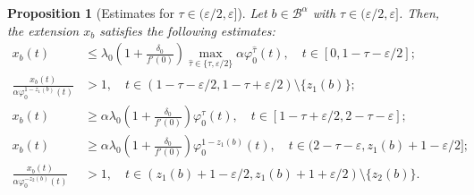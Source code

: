 \documentclass[a4paper,11pt]{article}
\theoremstyle{plain}
\newtheorem{prop}[thm]{Proposition}
\theoremstyle{definition}
\theoremstyle{definition}
\newcommand{\B}{\mathcal{B}}
\numberwithin{equation}{section}
\begin{document}
\begin{prop}[Estimates for $\tau\in(\varepsilon/2,\varepsilon{]}$] \label{prop:estimates2}
Let $b\in\B^\alpha$ with $\tau\in(\varepsilon/2,\varepsilon]$. Then, the extension $x_b$ satisfies the following estimates:
\begin{align}
    x_b(t) &\leq \lambda_0 \left( 1+\frac{\delta_0}{f'(0)} \right) \max_{\hat{\tau}\in\{\tau,\varepsilon/2\}} \alpha \varphi_0^{\hat{\tau}} (t), \quad t\in[0,1-\tau-\varepsilon/2]; \label{estimate4} \\ 
    \frac{x_b(t)}{\alpha \varphi_0^{1-z_1(b)}(t)} &>1, \quad t\in(1-\tau-\varepsilon/2,1-\tau+\varepsilon/2) \setminus \{ z_1(b) \};\label{stepness3} \\ 
    x_b(t) &\geq \alpha\lambda_0 \left( 1+\frac{\delta_0}{f'(0)} \right) \varphi_0^\tau (t), \quad t\in[1-\tau+\varepsilon/2, 2-\tau-\varepsilon];\label{estimate5} \\
    x_b(t) &\geq \alpha\lambda_0 \left( 1+\frac{\delta_0}{f'(0)} \right)\varphi_0^{1-z_1(b)}(t), \quad t\in(2-\tau-\varepsilon,z_1(b)+1-\varepsilon/2];\label{estimate6} \\
    \frac{x_b(t)}{\alpha \varphi_0^{-z_2(b)}(t)} &>1, \quad t\in(z_1(b)+1-\varepsilon/2, z_1(b)+1+\varepsilon/2)\setminus\{ z_2(b) \}. \label{stepness4}
\end{align}
\end{prop}
\end{document}

